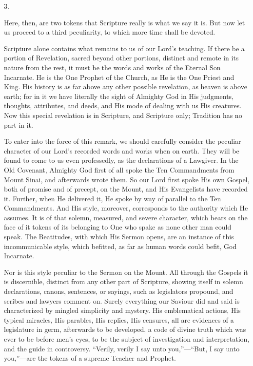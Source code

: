 3.

Here, then, are two tokens that Scripture really is what we say it
is. But now let us proceed to a third peculiarity, to which more time
shall be devoted.

Scripture alone contains what remains to us of our Lord's teaching.
If there be a portion of Revelation, sacred beyond other portions,
distinct and remote in its nature from the rest, it must be the words
and works of the Eternal Son Incarnate. He is the One Prophet of the
Church, as He is the One Priest and King. His history is as far above
any other possible revelation, as heaven is above earth; for in it we
have literally the sight of Almighty God in His judgments, thoughts,
attributes, and deeds, and His mode of dealing with us His creatures.
Now this special revelation is in Scripture, and Scripture only;
Tradition has no part in it.

To enter into the force of this remark, we should carefully
consider the peculiar character of our Lord's recorded words and works
when on earth. They will be found to come to us even professedly, as
the declarations of a Lawgiver. In the Old Covenant, Almighty God
first of all spoke the Ten Commandments from Mount Sinai, and
afterwards wrote them. So our Lord first spoke His own Gospel, both of
promise and of precept, on the Mount, and His Evangelists have
recorded it. Further, when He delivered it, He spoke by way of
parallel to the Ten Commandments. And His style, moreover, corresponds
to the authority which He assumes. It is of that solemn, measured, and
severe character, which bears on the face of it tokens of its
belonging to One who spake as none other man could speak. The
Beatitudes, with which His Sermon opens, are an instance of this
incommunicable style, which befitted, as far as human words could
befit, God Incarnate.

Nor is this style peculiar to the Sermon on the Mount. All through
the Gospels it is discernible, distinct from any other part of
Scripture, showing itself in solemn declarations, canons, sentences,
or sayings, such as legislators propound, and scribes and lawyers
comment on. Surely everything our Saviour did and said is
characterized by mingled simplicity and mystery. His emblematical
actions, His typical miracles, His parables, His replies, His
censures, all are evidences of a legislature in germ, afterwards to be
developed, a code of divine truth which was ever to be before men's
eyes, to be the subject of investigation and interpretation, and the
guide in controversy. ``Verily, verily I say unto you,''—``But,
I say unto you,''—are the tokens of a supreme Teacher and
Prophet.

